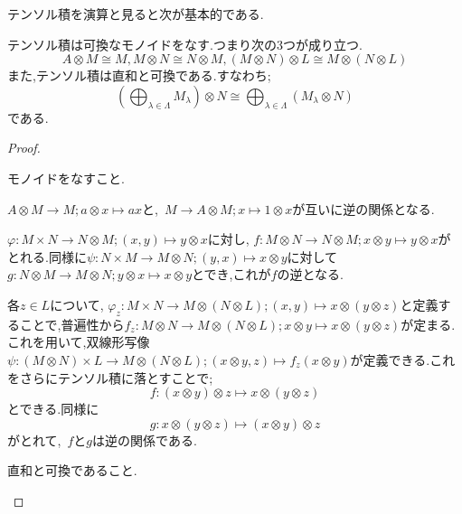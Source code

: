 テンソル積を演算と見ると次が基本的である.
\begin{prop}\label{prop:テンソル積は直和と可換}
	テンソル積は可換なモノイドをなす.つまり次の3つが成り立つ.
	\[A\otimes M\cong M, M\otimes N\cong N\otimes M, (M\otimes N)\otimes L\cong M\otimes (N\otimes L)\]
	また,テンソル積は直和と可換である.すなわち;
	\[\left(\bigoplus_{\lambda\in\Lambda} M_\lambda\right)\otimes N\cong \bigoplus_{\lambda\in\Lambda}(M_\lambda\otimes N)\]
	である.
\end{prop}
\begin{proof}
	\begin{step}
		\item モノイドをなすこと.
	\begin{sakura}
		\item $A\otimes M\to M;a\otimes x\mapsto ax$と,~$M\to A\otimes M;x\mapsto 1\otimes x$が互いに逆の関係となる.
		\item $\varphi:M\times N\to N\otimes M;(x,y)\mapsto y\otimes x$に対し, $f:M\otimes N\to N\otimes M;x\otimes y\mapsto y\otimes x$がとれる.同様に$\psi:N\times M\to M\otimes N;(y,x)\mapsto x\otimes y$に対して$g:N\otimes M\to M\otimes N;y\otimes x\mapsto x\otimes y$とでき,これが$f$の逆となる.
		\item 各$z\in L$について, $\varphi_z:M\times N\to M\otimes(N\otimes L);(x,y)\mapsto x\otimes(y\otimes z)$と定義することで,普遍性から$f_z:M\otimes N\to M\otimes(N\otimes L);x\otimes y\mapsto x\otimes(y\otimes z)$が定まる.これを用いて,双線形写像$\psi:(M\otimes N)\times L\to M\otimes(N\otimes L);(x\otimes y,z)\mapsto f_z(x\otimes y)$が定義できる.これをさらにテンソル積に落とすことで;
		\[f:(x\otimes y)\otimes z\mapsto x\otimes(y\otimes z)\]
		とできる.同様に
		\[g:x\otimes (y\otimes z)\mapsto (x\otimes y)\otimes z\]
		がとれて,~$f$と$g$は逆の関係である.
	\end{sakura}
	\item 直和と可換であること.
	

\end{step}
\end{proof}
